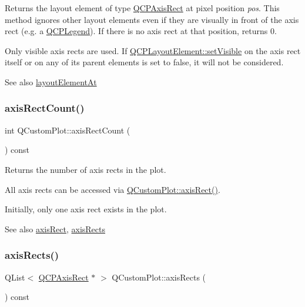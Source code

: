 Returns the layout element of type \mbox{\hyperlink{class_q_c_p_axis_rect}{Q\+C\+P\+Axis\+Rect}} at pixel position {\itshape pos}. This method ignores other layout elements even if they are visually in front of the axis rect (e.\+g. a \mbox{\hyperlink{class_q_c_p_legend}{Q\+C\+P\+Legend}}). If there is no axis rect at that position, returns 0.

Only visible axis rects are used. If \mbox{\hyperlink{class_q_c_p_layerable_a3bed99ddc396b48ce3ebfdc0418744f8}{Q\+C\+P\+Layout\+Element\+::set\+Visible}} on the axis rect itself or on any of its parent elements is set to false, it will not be considered.

\begin{DoxySeeAlso}{See also}
\mbox{\hyperlink{class_q_custom_plot_afaa1d304e0287d140fd238e90889ef3c}{layout\+Element\+At}} 
\end{DoxySeeAlso}
\mbox{\label{class_q_custom_plot_a8f85940aaac50efb466287d9d2d04ec6}} 
\subsubsection{\texorpdfstring{axisRectCount()}{axisRectCount()}}
{\footnotesize\ttfamily int Q\+Custom\+Plot\+::axis\+Rect\+Count (\begin{DoxyParamCaption}{ }\end{DoxyParamCaption}) const}

Returns the number of axis rects in the plot.

All axis rects can be accessed via \mbox{\hyperlink{class_q_custom_plot_ae5eefcb5f6ca26689b1fd4f6e25b42f9}{Q\+Custom\+Plot\+::axis\+Rect()}}.

Initially, only one axis rect exists in the plot.

\begin{DoxySeeAlso}{See also}
\mbox{\hyperlink{class_q_custom_plot_ae5eefcb5f6ca26689b1fd4f6e25b42f9}{axis\+Rect}}, \mbox{\hyperlink{class_q_custom_plot_a12af771429e2d7e313c8c5d5fca068fe}{axis\+Rects}} 
\end{DoxySeeAlso}
\mbox{\label{class_q_custom_plot_a12af771429e2d7e313c8c5d5fca068fe}} 
\subsubsection{\texorpdfstring{axisRects()}{axisRects()}}
{\footnotesize\ttfamily Q\+List$<$ \mbox{\hyperlink{class_q_c_p_axis_rect}{Q\+C\+P\+Axis\+Rect}} $\ast$ $>$ Q\+Custom\+Plot\+::axis\+Rects (\begin{DoxyParamCaption}{ }\end{DoxyParamCaption}) const}

